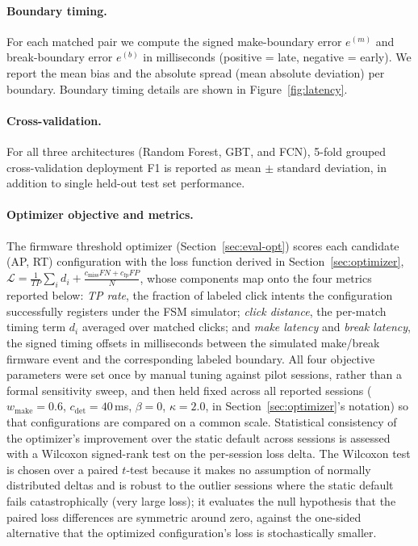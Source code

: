 \paragraph{Boundary timing.}
For each matched pair we compute the signed make-boundary error $e^{(m)}$ and
break-boundary error $e^{(b)}$ in milliseconds (positive = late, negative = early).
We report the mean bias and the absolute spread (mean absolute deviation) per boundary.
Boundary timing details are shown in Figure~\ref{fig:latency}.



\paragraph{Cross-validation.}
For all three architectures (Random Forest, GBT, and FCN), 5-fold grouped
cross-validation deployment F1 is reported as mean $\pm$ standard deviation, in
addition to single held-out test set performance.

\paragraph{Optimizer objective and metrics.}
The firmware threshold optimizer (Section~\ref{sec:eval-opt}) scores each
candidate (AP, RT) configuration with the loss function derived in
Section~\ref{sec:optimizer}, $\mathcal{L} = \frac{1}{TP}\sum_i d_i +
\frac{c_\text{miss} FN + c_\text{fp} FP}{N}$, whose components map onto the
four metrics reported below: \emph{TP rate}, the fraction of labeled click
intents the configuration successfully registers under the FSM simulator;
\emph{click distance}, the per-match timing term $d_i$ averaged over matched
clicks; and \emph{make latency} and \emph{break latency}, the signed timing
offsets in milliseconds between the simulated make/break firmware event and
the corresponding labeled boundary. All four objective parameters were set
once by manual tuning against pilot sessions, rather than a formal
sensitivity sweep, and then held fixed across all reported sessions
($w_\text{make}=0.6$, $c_\text{det}=40$\,ms, $\beta=0$, $\kappa=2.0$, in
Section~\ref{sec:optimizer}'s notation) so that configurations are compared
on a common scale.
Statistical consistency of the optimizer's improvement over the static
default across sessions is assessed
with a Wilcoxon signed-rank test on the per-session loss delta. The Wilcoxon
test is chosen over a paired $t$-test because it makes no assumption of
normally distributed deltas and is robust to the outlier sessions where the
static default fails catastrophically (very large loss); it evaluates the
null hypothesis that the paired loss differences are symmetric around zero,
against the one-sided alternative that the optimized configuration's loss is
stochastically smaller.

